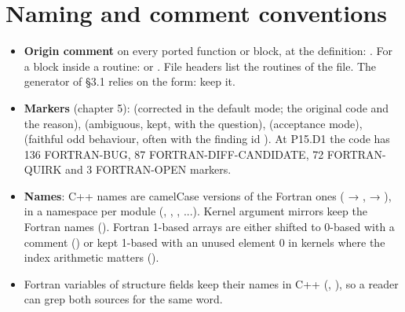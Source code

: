 \section{\texorpdfstring{Naming and comment conventions}{Naming and comment conventions}}\label{translation_report-03u5froutineu5fmap:34-naming-and-comment-conventions}
\begin{itemize}
\item \textbf{Origin comment} on every ported function or block, at the definition:
. For a block inside a routine:  or
. File headers list the routines of the file. The generator of §3.1 relies on the
 form: keep it.
\item \textbf{Markers} (chapter 5):  (corrected in the default mode; the original code and the reason),
 (ambiguous, kept, with the question),  (acceptance mode),
 (faithful odd behaviour, often with the finding id ). At P15.D1 the code has 136
FORTRAN-BUG,\allowbreak{} 87 FORTRAN-DIFF-CANDIDATE,\allowbreak{} 72 FORTRAN-QUIRK and 3 FORTRAN-OPEN markers.
\item \textbf{Names}: C++ names are camelCase versions of the Fortran ones ( → ,
 → ), in a namespace per module (, , ,
...). Kernel argument mirrors keep the Fortran names (). Fortran 1-based arrays are either shifted to
0-based with a comment () or kept 1-based with an unused element 0 in kernels where the index
arithmetic matters ().
\item Fortran variables of structure fields keep their names in C++ (, ), so a reader
can grep both sources for the same word.
\end{itemize}
